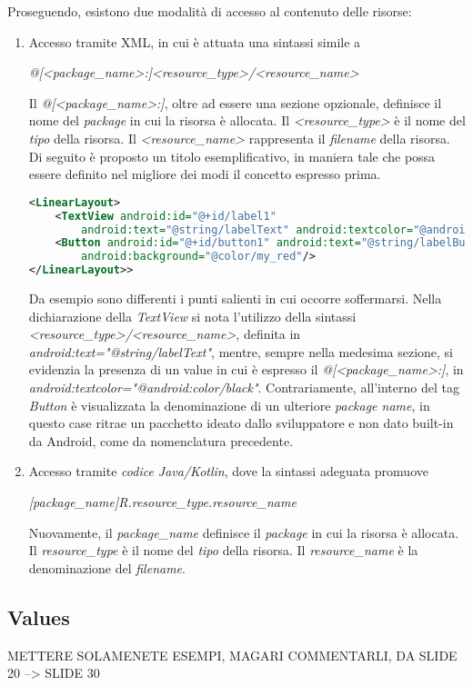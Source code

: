 \documentclass{article}
\begin{document}
Proseguendo, esistono due modalità di accesso al contenuto delle risorse:
\begin{enumerate}
    \itemsep0em
    \renewcommand*{\labelenumi}{-}
    \item Accesso tramite XML, in cui è attuata una sintassi simile a
    \begin{center}
        \textit{@[<package\_name>:]<resource\_type>/<resource\_name>}
    \end{center}
    Il \textit{@[<package\_name>:]}, oltre ad essere una sezione opzionale, definisce il nome del \textit{package} in cui la risorsa è allocata. Il \textit{<resource\_type>} è il nome del \textit{tipo} della risorsa. Il \textit{<resource\_name>} rappresenta il \textit{filename} della risorsa.\vspace*{7pt}\\
    Di seguito è proposto un titolo esemplificativo, in maniera tale che possa essere definito nel migliore dei modi il concetto espresso prima.
    \begin{lstlisting}[language=XML, title=Accesso al contenuto delle risorse mediante XML]
<LinearLayout>
    <TextView android:id="@+id/label1"
        android:text="@string/labelText" android:textcolor="@android:color/black"/>
    <Button android:id="@+id/button1" android:text="@string/labelButton"
        android:background="@color/my_red"/>
</LinearLayout>>
    \end{lstlisting}
    Da esempio sono differenti i punti salienti in cui occorre soffermarsi. Nella dichiarazione della \textit{TextView} si nota l'utilizzo della sintassi \textit{<resource\_type>/<resource\_name>}, definita in \textit{android:text="@string/labelText"}, mentre, sempre nella medesima sezione, si evidenzia la presenza di un value in cui è espresso il \textit{@[<package\_name>:]}, in \textit{android:textcolor="@android:color/black"}. Contrariamente, all'interno del tag \textit{Button} è visualizzata la denominazione di un ulteriore \textit{package name}, in questo case ritrae un pacchetto ideato dallo sviluppatore e non dato built-in da Android, come da nomenclatura precedente.
    \item Accesso tramite \textit{codice Java/Kotlin}, dove la sintassi adeguata promuove
    \begin{center}
        \textit{[package\_name]R.resource\_type.resource\_name}
    \end{center}
    Nuovamente, il \textit{package\_name} definisce il \textit{package} in cui la risorsa è allocata. Il \textit{resource\_type} è il nome del \textit{tipo} della risorsa. Il \textit{resource\_name} è la denominazione del \textit{filename}.
\end{enumerate}

\subsection*{Values}
METTERE SOLAMENETE ESEMPI, MAGARI COMMENTARLI, DA SLIDE 20 --> SLIDE 30
\end{document}
